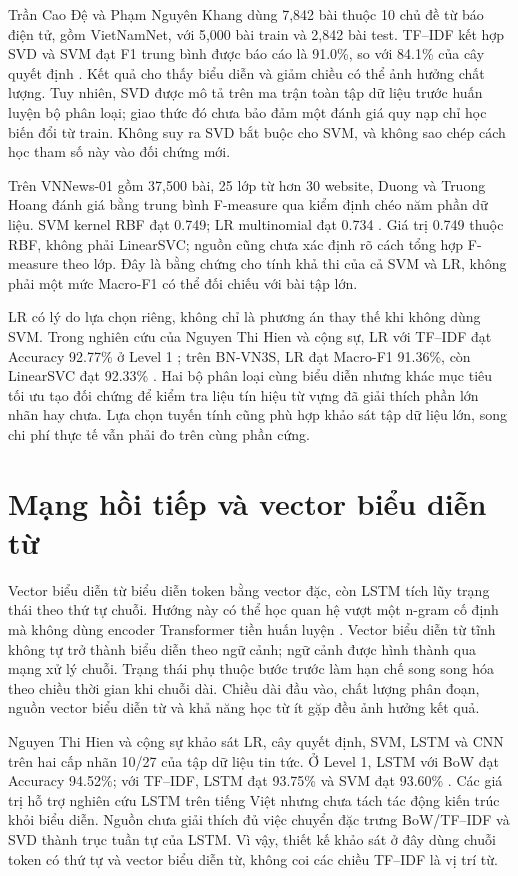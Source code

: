 Trần Cao Đệ và Phạm Nguyên Khang dùng 7,842 bài thuộc 10 chủ đề từ báo điện tử, gồm VietNamNet, với 5,000 bài train và 2,842 bài test. TF--IDF kết hợp SVD và SVM đạt F1 trung bình được báo cáo là 91.0\%, so với 84.1\% của cây quyết định \citep{de2012}. Kết quả cho thấy biểu diễn và giảm chiều có thể ảnh hưởng chất lượng. Tuy nhiên, SVD được mô tả trên ma trận toàn tập dữ liệu trước huấn luyện bộ phân loại; giao thức đó chưa bảo đảm một đánh giá quy nạp chỉ học biến đổi từ train. Không suy ra SVD bắt buộc cho SVM, và không sao chép cách học tham số này vào đối chứng mới.

Trên VNNews-01 gồm 37,500 bài, 25 lớp từ hơn 30 website, Duong và Truong Hoang đánh giá bằng trung bình F-measure qua kiểm định chéo năm phần dữ liệu. SVM kernel RBF đạt 0.749; LR multinomial đạt 0.734 \citep{duong2019}. Giá trị 0.749 thuộc RBF, không phải LinearSVC; nguồn cũng chưa xác định rõ cách tổng hợp F-measure theo lớp. Đây là bằng chứng cho tính khả thi của cả SVM và LR, không phải một mức Macro-F1 có thể đối chiếu với bài tập lớn.

LR có lý do lựa chọn riêng, không chỉ là phương án thay thế khi không dùng SVM. Trong nghiên cứu của Nguyen Thi Hien và cộng sự, LR với TF--IDF đạt Accuracy 92.77\% ở Level 1 \citep{hien2024}; trên BN-VN3S, LR đạt Macro-F1 91.36\%, còn LinearSVC đạt 92.33\% \citep{chau2026}. Hai bộ phân loại cùng biểu diễn nhưng khác mục tiêu tối ưu tạo đối chứng để kiểm tra liệu tín hiệu từ vựng đã giải thích phần lớn nhãn hay chưa. Lựa chọn tuyến tính cũng phù hợp khảo sát tập dữ liệu lớn, song chi phí thực tế vẫn phải đo trên cùng phần cứng.

\FloatBarrier
\section{Mạng hồi tiếp và vector biểu diễn từ}
Vector biểu diễn từ biểu diễn token bằng vector đặc, còn LSTM tích lũy trạng thái theo thứ tự chuỗi. Hướng này có thể học quan hệ vượt một n-gram cố định mà không dùng encoder Transformer tiền huấn luyện \citep{kowsari2019}. Vector biểu diễn từ tĩnh không tự trở thành biểu diễn theo ngữ cảnh; ngữ cảnh được hình thành qua mạng xử lý chuỗi. Trạng thái phụ thuộc bước trước làm hạn chế song song hóa theo chiều thời gian khi chuỗi dài. Chiều dài đầu vào, chất lượng phân đoạn, nguồn vector biểu diễn từ và khả năng học từ ít gặp đều ảnh hưởng kết quả.

Nguyen Thi Hien và cộng sự khảo sát LR, cây quyết định, SVM, LSTM và CNN trên hai cấp nhãn 10/27 của tập dữ liệu tin tức. Ở Level 1, LSTM với BoW đạt Accuracy 94.52\%; với TF--IDF, LSTM đạt 93.75\% và SVM đạt 93.60\% \citep{hien2024}. Các giá trị hỗ trợ nghiên cứu LSTM trên tiếng Việt nhưng chưa tách tác động kiến trúc khỏi biểu diễn. Nguồn chưa giải thích đủ việc chuyển đặc trưng BoW/TF--IDF và SVD thành trục tuần tự của LSTM. Vì vậy, thiết kế khảo sát ở đây dùng chuỗi token có thứ tự và vector biểu diễn từ, không coi các chiều TF--IDF là vị trí từ.

